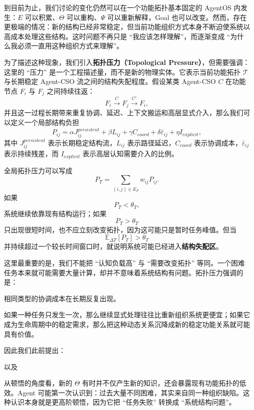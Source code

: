 到目前为止，我们讨论的变化仍然可以在一个功能拓扑基本固定的 AgentOS 内发生：$E$ 可以积累、$\Theta$ 可以重构、$\Psi$ 可以重新解释，Goal 也可以改变。然而，存在更极端的情况：新的结构已经非常稳定，但当前功能组织方式本身不断迫使系统以高成本处理这些结构。这时问题不再只是 ``我应该怎样理解''，而逐渐变成 ``为什么我必须一直用这种组织方式来理解''。

为了描述这种现象，我们引入\textbf{拓扑压力（Topological Pressure）}，但需要强调：这里的 ``压力'' 是一个工程描述量，而不是新的物理实体。它表示当前功能拓扑 $\mathcal T$ 与长期稳定 Agent-CSO 流之间的结构失配程度。假设某类 Agent-CSO $C$ 在功能节点 $F_i$ 与 $F_j$ 之间持续往返：
\[
F_i
\xrightarrow{C}
F_j
\xrightarrow{C'}
F_i,
\]
并且这一过程长期带来重复协调、延迟、上下文搬运和高层显式介入，那么我们可以定义一个局部结构负担
\[
P_{ij}
=
\alpha J_{ij}^{persistent}
+
\beta L_{ij}
+
\gamma C_{coord}
+
\delta \bar{\varepsilon}_{ij}
+
\eta I_{explicit},
\]
其中 $J_{ij}^{persistent}$ 表示长期稳定结构流，$L_{ij}$ 表示路径延迟，$C_{coord}$ 表示协调成本，$\bar{\varepsilon}_{ij}$ 表示持续残差，而 $I_{explicit}$ 表示高层认知需要介入的比例。

全局拓扑压力可以写成
\[
P_T
=
\sum_{(i,j)\in E_F}
w_{ij}P_{ij}.
\]
如果
\[
P_T<\theta_T,
\]
系统继续依靠现有结构运行；如果
\[
P_T>\theta_T
\]
只出现很短时间，也不应立刻改变拓扑，因为这可能只是暂时任务峰值。但当
\[
\mathbb E_{\Delta T}[P_T]
>
\theta_T
\]
并持续超过一个较长时间窗口时，就说明系统可能已经进入\textbf{结构失配区}。

这里最重要的是，我们不能把 ``认知负载高'' 与 ``需要改变拓扑'' 等同。一个困难任务本来就可能需要大量计算，却并不意味着系统结构有问题。拓扑压力强调的是：
\begin{statementbox}
相同类型的协调成本在长期反复出现。
\end{statementbox}
如果一种任务只发生一次，那么继续显式处理往往比重新组织系统更便宜；如果它成为生命周期中的稳定需求，那么把这种动态关系沉降成新的稳定功能关系就可能具有价值。

因此我们此前提出：
\begin{statementbox}
\centering
{}
\end{statementbox}
以及
\begin{statementbox}
\centering
{}
\end{statementbox}
从顿悟的角度看，新的 $\Theta$ 有时并不仅产生新的知识，还会暴露现有功能拓扑的低效。Agent 可能第一次认识到：过去大量不同困难，其实来自同一种组织缺陷。这种认识本身就是更高阶顿悟，因为它把 ``任务失败'' 转换成 ``系统结构问题''。

